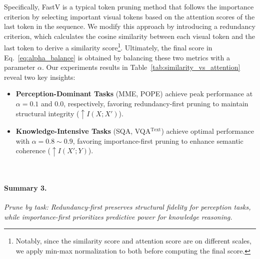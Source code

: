 Specifically, FastV is a typical token pruning method that follows the importance criterion by selecting important visual tokens based on the attention scores of the last token in the sequence. We modify this approach by introducing a redundancy criterion, which calculates the cosine similarity between each visual token and the last token to derive a similarity score\footnote{Notably, since the similarity score and attention score are on different scales, we apply min-max normalization to both before computing the final score.}. Ultimately, the final score in Eq.~\ref{eq:alpha_balance} is obtained by balancing these two metrics with a parameter $\alpha$.
Our experiments results in Table~\ref{tab:similarity_vs_attention} reveal two key insights: %

\begin{itemize}[leftmargin=10pt, topsep=0pt, itemsep=1pt, partopsep=1pt, parsep=1pt]
    \item \textbf{Perception-Dominant Tasks} (MME, POPE) achieve peak performance at $\alpha=0.1$ and $0.0$, respectively, favoring redundancy-first pruning to maintain structural integrity ($\uparrow I(X;X')$).
    
    \item \textbf{Knowledge-Intensive Tasks} (SQA, VQA$^\text{Text}$) achieve optimal performance with $\alpha=0.8\sim0.9$, favoring importance-first pruning to enhance semantic coherence ($\uparrow I(X';Y)$).
\end{itemize}
\vspace{-2mm}
\begin{takeaways}
\ \paragraph{Summary 3.}
\emph{Prune by task: Redundancy-first preserves structural fidelity for perception tasks, while importance-first prioritizes predictive power for knowledge reasoning.}
\end{takeaways}













